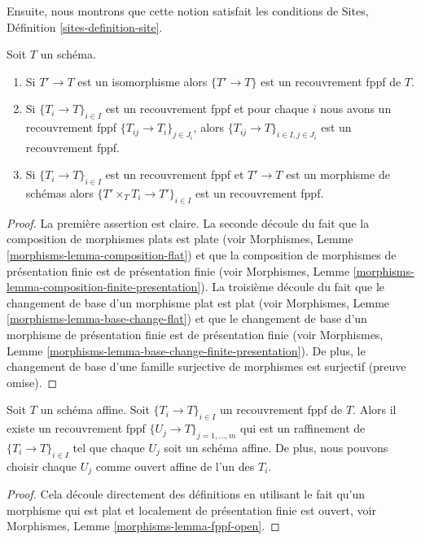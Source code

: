 \noindent
Ensuite, nous montrons que cette notion satisfait les conditions de Sites, Définition \ref{sites-definition-site}.

\begin{lemma}
\label{lemma-fppf}
Soit $T$ un schéma.
\begin{enumerate}
\item Si $T' \to T$ est un isomorphisme alors $\{T' \to T\}$ est un recouvrement fppf de $T$.
\item Si $\{T_i \to T\}_{i\in I}$ est un recouvrement fppf et pour chaque $i$ nous avons un recouvrement fppf $\{T_{ij} \to T_i\}_{j\in J_i}$, alors $\{T_{ij} \to T\}_{i \in I, j\in J_i}$ est un recouvrement fppf.
\item Si $\{T_i \to T\}_{i\in I}$ est un recouvrement fppf et $T' \to T$ est un morphisme de schémas alors $\{T' \times_T T_i \to T'\}_{i\in I}$ est un recouvrement fppf.
\end{enumerate}
\end{lemma}

\begin{proof}
La première assertion est claire. La seconde découle du fait que la composition de morphismes plats est plate (voir Morphismes, Lemme \ref{morphisms-lemma-composition-flat}) et que la composition de morphismes de présentation finie est de présentation finie (voir Morphismes, Lemme \ref{morphisms-lemma-composition-finite-presentation}). La troisième découle du fait que le changement de base d'un morphisme plat est plat (voir Morphismes, Lemme \ref{morphisms-lemma-base-change-flat}) et que le changement de base d'un morphisme de présentation finie est de présentation finie (voir Morphismes, Lemme \ref{morphisms-lemma-base-change-finite-presentation}). De plus, le changement de base d'une famille surjective de morphismes est surjectif (preuve omise).
\end{proof}

\begin{lemma}
\label{lemma-fppf-affine}
Soit $T$ un schéma affine. Soit $\{T_i \to T\}_{i \in I}$ un recouvrement fppf de $T$. Alors il existe un recouvrement fppf $\{U_j \to T\}_{j = 1, \ldots, m}$ qui est un raffinement de $\{T_i \to T\}_{i \in I}$ tel que chaque $U_j$ soit un schéma affine. De plus, nous pouvons choisir chaque $U_j$ comme ouvert affine de l'un des $T_i$.
\end{lemma}

\begin{proof}
Cela découle directement des définitions en utilisant le fait qu'un morphisme qui est plat et localement de présentation finie est ouvert, voir Morphismes, Lemme \ref{morphisms-lemma-fppf-open}.
\end{proof}

